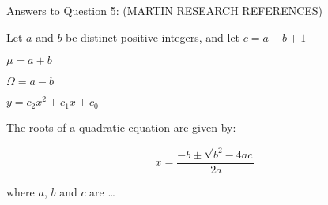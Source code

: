 \newpage Answers to Question 5: (MARTIN RESEARCH REFERENCES)

\newpage 
Let $a$ and $b$ be distinct positive integers, and let $c = a - b + 1$

$\mu = a + b $


$\Omega = a - b $

$y = c_2 x^2 + c_1 x + c_0 $

The roots of a quadratic equation are given by:

\begin{equation}
x = \frac{-b \pm \sqrt{b^2 - 4ac}} {2a}
\end{equation}

where $a$, $b$ and $c$ are \ldots
